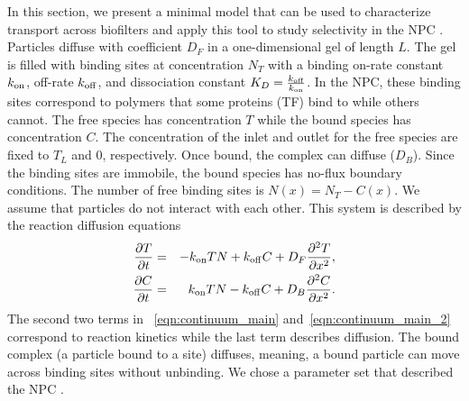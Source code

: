 In this section, we present a minimal model that can be used to characterize
transport across biofilters and apply this tool to study selectivity in the NPC
.  Particles diffuse with coefficient $D_F$ in a
one-dimensional gel of length $L$.  The gel is filled with binding sites at
concentration $N_T$ with a binding on-rate constant $k_{\rm on}$, off-rate $k_{\rm off}$,
and dissociation constant $K_D = \frac{k_{\rm off}}{k_{\rm on}}$.  In the NPC, these binding
sites correspond to polymers  that some proteins (TF) bind to while others
cannot.  The free species has concentration $T$ while the bound species has
concentration $C$.  The concentration of the inlet and outlet for the free
species are fixed to $T_L$ and $0$, respectively.  Once bound, the  complex can
diffuse ($D_B$).  Since the binding sites are immobile, the bound species has
no-flux boundary conditions.  The number of free binding sites is $N(x) = N_T -
C(x)$. We assume that particles do not interact with each other.  This system is
described by the reaction diffusion equations
%
\begin{eqnarray}
\label{eqn:continuum_main} 
  \frac{\partial T}{\partial t} &=& 
  -k_{\rm on} T N+k_{\rm off} C +D_F
       \frac{\partial^2 T}{\partial x^2},
   \\ 
\label{eqn:continuum_main_2} 
  \frac{\partial C}{\partial t} &=& k_{\rm on} T N -k_{\rm off} C + 
        D_B \frac{\partial^2 C}{\partial x^2}.
\end{eqnarray}
%
The second two terms in \eqn~\ref{eqn:continuum_main}
and~\ref{eqn:continuum_main_2} correspond to reaction kinetics while the last
term describes diffusion.  The bound complex (a particle bound to a site)
diffuses, meaning, a bound particle can move across binding sites without
unbinding.  We chose a parameter set that described the NPC
. 

